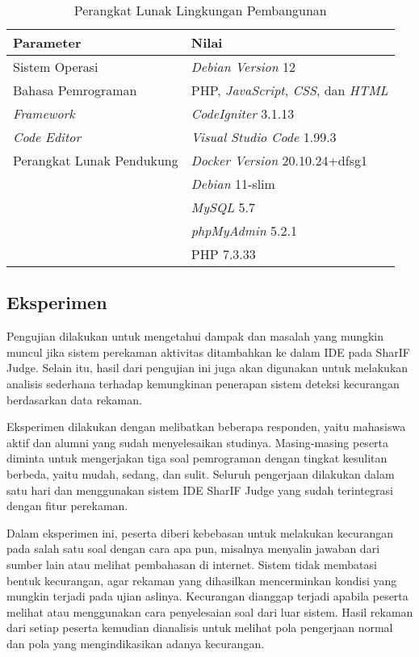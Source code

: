 \begin{table}[H]
    \caption{Perangkat Lunak Lingkungan Pembangunan}
    \label{tab:5:2:1:lunakpembangunan}
    \centering
    \begin{tabular}{|l|l|}
        \hline
        \textbf{Parameter}        & \textbf{Nilai}                                            \\ \hline
        Sistem Operasi            & \textit{Debian Version} 12     \\ \hline
        Bahasa Pemrograman        & PHP, \textit{JavaScript}, \textit{CSS}, dan \textit{HTML} \\ \hline
        \textit{Framework}        & \textit{CodeIgniter} 3.1.13                               \\ \hline
        \textit{Code Editor}      & \textit{Visual Studio Code} 1.99.3                        \\ \hline
        Perangkat Lunak Pendukung & \textit{Docker Version} 20.10.24+dfsg1                            \\ & \textit{Debian} 11-slim \\ & \textit{MySQL} 5.7 \\ & \textit{phpMyAdmin} 5.2.1 \\ & PHP 7.3.33\\ \hline
    \end{tabular}
\end{table}

\subsection{Eksperimen}

Pengujian dilakukan untuk mengetahui dampak dan masalah yang mungkin muncul jika sistem perekaman aktivitas ditambahkan ke dalam IDE pada SharIF Judge. Selain itu, hasil dari pengujian ini juga akan digunakan untuk melakukan analisis sederhana terhadap kemungkinan penerapan sistem deteksi kecurangan berdasarkan data rekaman.

Eksperimen dilakukan dengan melibatkan beberapa responden, yaitu mahasiswa aktif dan alumni yang sudah menyelesaikan studinya. Masing-masing peserta diminta untuk mengerjakan tiga soal pemrograman dengan tingkat kesulitan berbeda, yaitu mudah, sedang, dan sulit. Seluruh pengerjaan dilakukan dalam satu hari dan menggunakan sistem IDE SharIF Judge yang sudah terintegrasi dengan fitur perekaman.

Dalam eksperimen ini, peserta diberi kebebasan untuk melakukan kecurangan pada salah satu soal dengan cara apa pun, misalnya menyalin jawaban dari sumber lain atau melihat pembahasan di internet. Sistem tidak membatasi bentuk kecurangan, agar rekaman yang dihasilkan mencerminkan kondisi yang mungkin terjadi pada ujian aslinya. Kecurangan dianggap terjadi apabila peserta melihat atau menggunakan cara penyelesaian soal dari luar sistem. Hasil rekaman dari setiap peserta kemudian dianalisis untuk melihat pola pengerjaan normal dan pola yang mengindikasikan adanya kecurangan.

